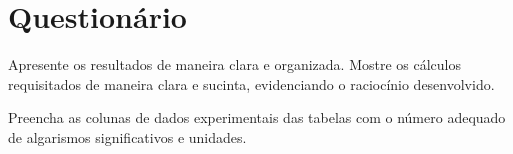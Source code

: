 \cleardoublepage


\vspace{15mm}

\begin{fullwidth}
\noindent{}
\vspace{5mm}

\noindent{}

\noindent{}

\noindent{}

\noindent{}

\noindent{}
\end{fullwidth}

\vspace{5mm}

\section{Questionário}

\begin{question}[type={exam}]{1}
Apresente os resultados de maneira clara e organizada. Mostre os cálculos requisitados de maneira clara e sucinta, evidenciando o raciocínio desenvolvido.
\end{question}

\begin{question}[type={exam}]{1}
Preencha as colunas de dados experimentais das tabelas com o número adequado de algarismos significativos e unidades.
\end{question}

